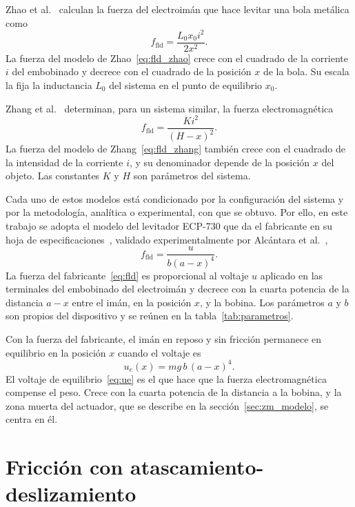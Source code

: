 Zhao et al.~\cite{zhao} calculan la fuerza del electroimán que hace levitar una bola metálica como
\begin{equation}
f_{\text{fld}} = \frac{L_0 x_0 i^2}{2x^2} .
\label{eq:fld_zhao}
\end{equation}
La fuerza del modelo de Zhao~\eqref{eq:fld_zhao} crece con el cuadrado de la corriente $i$ del embobinado y decrece con el cuadrado de la posición $x$ de la bola. Su escala la fija la inductancia $L_0$ del sistema en el punto de equilibrio $x_0$.

Zhang et al.~\cite{feifei} determinan, para un sistema similar, la fuerza electromagnética
\begin{equation}
f_{\text{fld}} = \frac{K i^2}{(H - x)^2} .
\label{eq:fld_zhang}
\end{equation}
La fuerza del modelo de Zhang~\eqref{eq:fld_zhang} también crece con el cuadrado de la intensidad de la corriente $i$, y su denominador depende de la posición $x$ del objeto. Las constantes $K$ y $H$ son parámetros del sistema.

Cada uno de estos modelos está condicionado por la configuración del sistema y por la metodología, analítica o experimental, con que se obtuvo. Por ello, en este trabajo se adopta el modelo del levitador ECP-730 que da el fabricante en su hoja de especificaciones~\cite{parks}, validado experimentalmente por Alcántara et al.~\cite{alcantara},
\begin{equation}
f_{\text{fld}} = \frac{u}{b(a-x)^4} .
\label{eq:fld}
\end{equation}
La fuerza del fabricante~\eqref{eq:fld} es proporcional al voltaje $u$ aplicado en las terminales del embobinado del electroimán y decrece con la cuarta potencia de la distancia $a-x$ entre el imán, en la posición $x$, y la bobina. Los parámetros $a$ y $b$ son propios del dispositivo y se reúnen en la tabla~\ref{tab:parametros}.

Con la fuerza del fabricante, el imán en reposo y sin fricción permanece en equilibrio en la posición $x$ cuando el voltaje es
\begin{equation}
u_e(x) = mg\,b\,(a-x)^4 .
\label{eq:ue}
\end{equation}
El voltaje de equilibrio~\eqref{eq:ue} es el que hace que la fuerza electromagnética compense el peso. Crece con la cuarta potencia de la distancia a la bobina, y la zona muerta del actuador, que se describe en la sección~\ref{sec:zm_modelo}, se centra en él.

\section{Fricción con atascamiento-deslizamiento}\label{sec:friccion_modelo}

